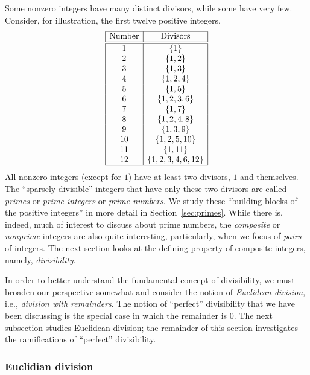 Some nonzero integers have many distinct divisors, while some have very few.  Consider, for illustration, the first twelve positive integers.
\[ \begin{array}{|c|c|}
\hline
\mbox{Number} & \mbox{Divisors} \\
\hline
\hline
1  &  \{ 1 \} \\
2  &  \{ 1, 2 \} \\
3  &  \{ 1, 3 \} \\
4  &  \{ 1, 2, 4 \} \\
5  &  \{ 1, 5 \} \\
6  &  \{ 1, 2, 3, 6 \} \\
7  &  \{ 1, 7 \} \\
8  &  \{ 1, 2, 4, 8 \} \\
9  &  \{ 1, 3, 9 \} \\
10  & \{ 1, 2, 5, 10 \} \\
11  & \{ 1, 11 \} \\
12  & \{ 1, 2, 3, 4, 6, 12 \} \\
\hline
\end{array}
\]
All nonzero integers (except for $1$) have at least two divisors, $1$ and themselves.  The ``sparsely divisible'' integers that have only these two divisors are called {\it primes} or {\it prime  integers} or {\it prime numbers}.  We study these ``building blocks of the positive integers'' in more detail in Section~\ref{sec:primes}.  While there is, indeed, much of interest to discuss about prime numbers, the {\it composite} or {\em nonprime} integers are also quite interesting, particularly, when we focus of {\em pairs} of integers.  The next section looks at the defining property of composite integers, namely, {\em divisibility}.

  

\medskip


In order to better understand the fundamental concept of divisibility, we must broaden our perspective somewhat and consider the notion of {\em Euclidean division}, i.e., {\it division with remainders}.  The notion of ``perfect'' divisibility that we have been discussing is the special case in which the remainder is $0$.  The next subsection studies Euclidean division; the remainder of this section investigates the ramifications of ``perfect'' divisibility.

\subsubsection{Euclidian division}
\label{sec:euclidian}
   

